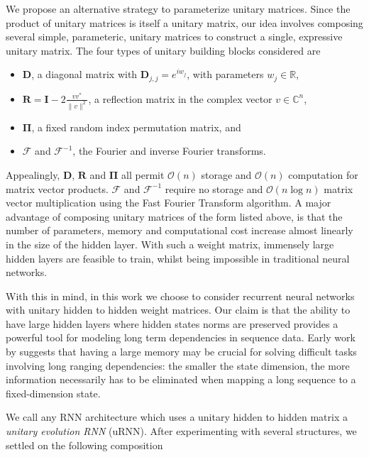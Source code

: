 \documentclass{article} %
\newcommand{\matr}[1]{\mathbf{#1}}
\newcommand\RR{\mathbb{R}}
\begin{document}
We propose an alternative strategy to parameterize unitary matrices. 
Since the product of unitary matrices is itself a unitary matrix, our idea involves
composing several simple, parameteric, unitary matrices to construct a single, expressive unitary matrix.
The four types of unitary building blocks considered are 

\begin{itemize}
  \item $\matr{D}$, a diagonal matrix with $\matr{D}_{j,j} = e^{i w_j}$, with parameters $w_j \in \RR$,
  \item $\matr{R} = \matr{I} - 2 \frac{v v^*}{\|v\|^2}$, a reflection matrix in the complex vector 
  $v \in \mathbb{C}^n$, 
  \item $\matr{\Pi}$, a fixed random index permutation matrix, and
  \item $\mathcal{F}$ and $\mathcal{F}^{-1}$, the Fourier and inverse Fourier transforms.
\end{itemize}

Appealingly, $\matr{D}$, $\matr{R}$ and $\matr{\Pi}$ all permit $\mathcal{O}(n)$ storage and 
$\mathcal{O}(n)$ computation for matrix vector products. $\mathcal{F}$ and $\mathcal{F}^{-1}$
require no storage and $\mathcal{O}(n \log n)$ matrix vector multiplication using the Fast Fourier
Transform algorithm. A major advantage of composing unitary matrices of the form listed above, is 
that the number of parameters, memory and computational cost increase almost linearly in the size
of the hidden layer. With such a weight matrix, immensely large hidden layers are feasible to train, 
whilst being impossible in traditional neural networks. 
 
With this in mind, in this work we choose to consider recurrent neural networks with unitary hidden to hidden
weight matrices. Our claim is that the ability to have large hidden layers where hidden 
states norms are preserved provides a powerful tool for modeling long term dependencies in sequence data. 
Early work by \cite{Yoshua94} suggests that having a large memory may be crucial for solving 
difficult tasks involving long ranging dependencies: the smaller the state dimension, the more
information necessarily has to be eliminated when mapping a long sequence to a fixed-dimension state.

We call any RNN architecture which uses a unitary hidden to hidden matrix a \textit{unitary evolution RNN}
(uRNN). After experimenting with several structures, we settled on the following composition
\end{document}
